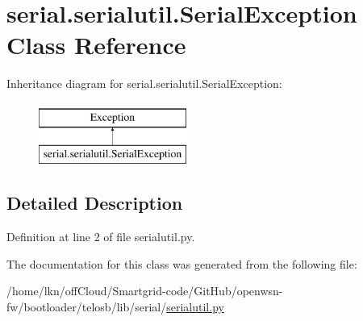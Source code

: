 \hypertarget{classserial_1_1serialutil_1_1_serial_exception}{}\section{serial.\+serialutil.\+Serial\+Exception Class Reference}
\label{classserial_1_1serialutil_1_1_serial_exception}
Inheritance diagram for serial.\+serialutil.\+Serial\+Exception\+:\begin{figure}[H]
\begin{center}
\leavevmode
\includegraphics[height=2.000000cm]{classserial_1_1serialutil_1_1_serial_exception}
\end{center}
\end{figure}


\subsection{Detailed Description}


Definition at line 2 of file serialutil.\+py.



The documentation for this class was generated from the following file\+:\begin{DoxyCompactItemize}
\item 
/home/lkn/off\+Cloud/\+Smartgrid-\/code/\+Git\+Hub/openwsn-\/fw/bootloader/telosb/lib/serial/\hyperlink{serialutil_8py}{serialutil.\+py}\end{DoxyCompactItemize}
